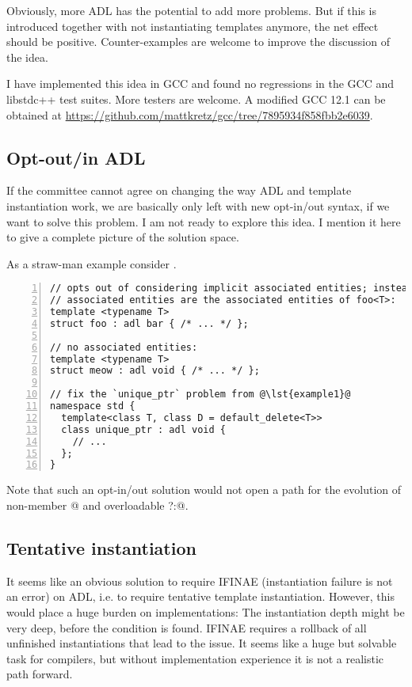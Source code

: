 Obviously, more ADL has the potential to add more problems. But if this is introduced 
together with not instantiating templates anymore, the net effect should be positive. 
Counter-examples are welcome to improve the discussion of the idea.

I have implemented this idea in GCC and found no regressions in the GCC and libstdc++ test 
suites. More testers are welcome. A modified GCC 12.1 can be obtained at 
\url{https://github.com/mattkretz/gcc/tree/7895934f858fbb2e6039}.

\subsection{Opt-out/in ADL}

If the committee cannot agree on changing the way ADL and template instantiation work, we 
are basically only left with new opt-in/out syntax, if we want to solve this problem. I am 
not ready to explore this idea. I mention it here to give a complete picture of the 
solution space.

As a straw-man example consider .
\begin{lstlisting}[numbers=left,float={hbtp},label=lst:optinoutadl,caption={
Straw-man opt-in/out syntax for ADL
}]
// opts out of considering implicit associated entities; instead `bar` and its
// associated entities are the associated entities of foo<T>:
template <typename T>
struct foo : adl bar { /* ... */ };

// no associated entities:
template <typename T>
struct meow : adl void { /* ... */ };

// fix the `unique_ptr` problem from @\lst{example1}@
namespace std {
  template<class T, class D = default_delete<T>>
  class unique_ptr : adl void {
    // ...
  };
}
\end{lstlisting}
Note that such an opt-in/out solution would not open a path for the evolution of 
non-member \codelst@operator[]@ and overloadable \codelst@operator?:@.

\subsection{Tentative instantiation}

It seems like an obvious solution to require IFINAE (instantiation failure is not an 
error) on ADL, i.e. to require tentative template instantiation. However, this would place 
a huge burden on implementations: The instantiation depth might be very deep, before the 
condition is found. IFINAE requires a rollback of all unfinished instantiations that lead 
to the issue. It seems like a huge but solvable task for compilers, but without 
implementation experience it is not a realistic path forward.


